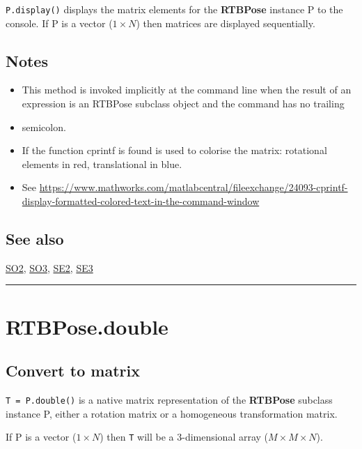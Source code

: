 \texttt{P.display()} displays the matrix elements for the \textbf{\color{red} RTBPose} instance P to
the console. If P is a vector ($1 \times N$) then matrices are displayed sequentially.


\subsection*{Notes}
\begin{itemize}
  \item This method is invoked implicitly at the command line when the result    of an expression is an RTBPose subclass object and the command has no trailing
  \item semicolon.
  \item If the function cprintf is found is used to colorise the matrix:    rotational elements in red, translational in blue.
  \item See \url{https://www.mathworks.com/matlabcentral/fileexchange/24093-cprintf-display-formatted-colored-text-in-the-command-window}
\end{itemize}

\subsection*{See also}


\hyperlink{SO2}{\color{blue} SO2}, \hyperlink{SO3}{\color{blue} SO3}, \hyperlink{SE2}{\color{blue} SE2}, \hyperlink{SE3}{\color{blue} SE3}

\vspace{1.5ex}\hrule

\hypertarget{RTBPose.double}{\section*{RTBPose.double}}
\subsection*{Convert to matrix}


\texttt{T = P.double()} is a native matrix representation of the \textbf{\color{red} RTBPose}
subclass instance P, either a rotation matrix or a homogeneous
transformation matrix.



If P is a vector ($1 \times N$) then \texttt{T} will be a 3-dimensional array ($M \times M \times N$).


